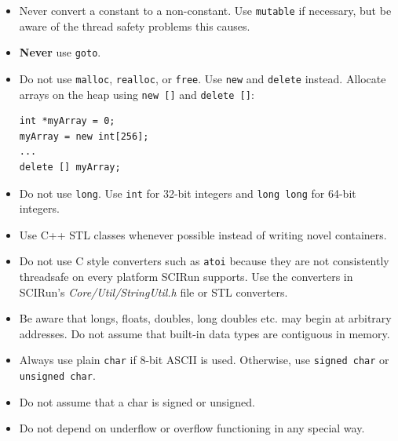 \documentclass[fleqn,12pt,openany]{book}
\begin{document}
\begin{itemize}
\item
Never convert a constant to a non-constant.
Use \texttt{mutable} if necessary, but be aware of the thread safety problems this causes.

\item
\textbf{Never} use \texttt{goto}.
 
\item
Do not use \texttt{malloc}, \texttt{realloc}, or \texttt{free}.
Use \texttt{new} and \texttt{delete} instead.
Allocate arrays on the heap using \texttt{new []} and \texttt{delete []}:

\begin{verbatim}
int *myArray = 0;
myArray = new int[256];
...
delete [] myArray;
\end{verbatim}


\item
Do not use \texttt{long}.
Use \texttt{int} for 32-bit integers and \texttt{long long} for 64-bit integers.

\item
Use C++ STL classes whenever possible instead of writing novel containers.

\item
Do not use C style converters such as \texttt{atoi} because they are not consistently threadsafe on every platform SCIRun supports.
Use the converters in SCIRun's \emph{Core/Util/StringUtil.h} file or STL converters.

\item
Be aware that longs, floats, doubles, long doubles etc. may begin at arbitrary addresses.
Do not assume that built-in data types are contiguous in memory. 

\item
Always use plain \texttt{char} if 8-bit ASCII is used.
Otherwise, use \texttt{signed char} or \texttt{unsigned char}. 

\item
Do not assume that a char is signed or unsigned. 

\item
Do not depend on underflow or overflow functioning in any special way. 

\end{itemize}
\end{document}
